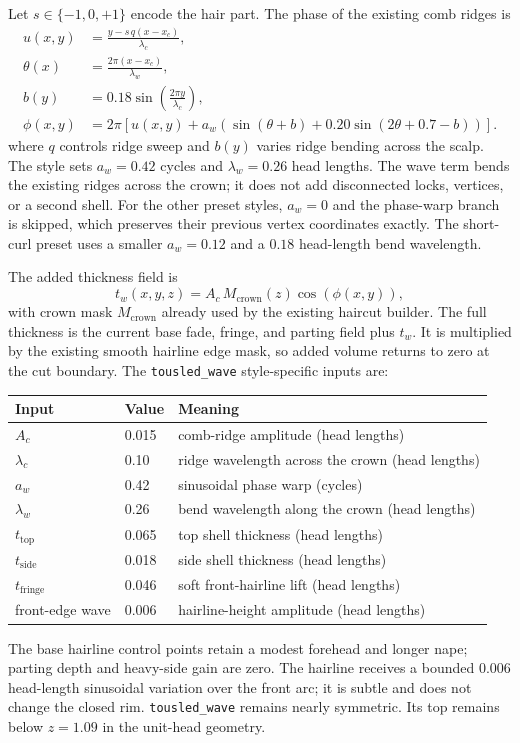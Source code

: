 \documentclass[11pt]{article}
\begin{document}
Let $s\in\{-1,0,+1\}$ encode the hair part. The phase of the existing comb
ridges is
\begin{align}
 u(x,y) &= \frac{y-s\,q(x-x_c)}{\lambda_c},\\
 \theta(x) &= \frac{2\pi(x-x_c)}{\lambda_w},\\
 b(y) &= 0.18\sin\left(\frac{2\pi y}{\lambda_c}\right),\\
 \phi(x,y) &= 2\pi\left[u(x,y)+a_w\left(\sin(\theta+b)+0.20\sin(2\theta+0.7-b)\right)\right].
\end{align}
where $q$ controls ridge sweep and $b(y)$ varies ridge bending across the scalp. The style sets $a_w=0.42$ cycles and
$\lambda_w=0.26$ head lengths. The wave term bends the existing ridges across
the crown; it does not add disconnected locks, vertices, or a second shell.
For the other preset styles, $a_w=0$ and the phase-warp branch is skipped,
which preserves their previous vertex coordinates exactly. The short-curl
preset uses a smaller $a_w=0.12$ and a $0.18$ head-length bend wavelength.

The added thickness field is
\begin{equation}
 t_w(x,y,z)=A_c\,M_{\mathrm{crown}}(z)\cos(\phi(x,y)),
\end{equation}
with crown mask $M_{\mathrm{crown}}$ already used by the existing haircut
builder. The full thickness is the current base fade, fringe, and parting
field plus $t_w$. It is multiplied by the existing smooth hairline edge mask,
so added volume returns to zero at the cut boundary. The \texttt{tousled\_wave}
style-specific inputs are:
\begin{center}
\begin{tabular}{lll}
\toprule
Input & Value & Meaning \\
\midrule
$A_c$ & 0.015 & comb-ridge amplitude (head lengths) \\
$\lambda_c$ & 0.10 & ridge wavelength across the crown (head lengths) \\
$a_w$ & 0.42 & sinusoidal phase warp (cycles) \\
$\lambda_w$ & 0.26 & bend wavelength along the crown (head lengths) \\
$t_{\mathrm{top}}$ & 0.065 & top shell thickness (head lengths) \\
$t_{\mathrm{side}}$ & 0.018 & side shell thickness (head lengths) \\
$t_{\mathrm{fringe}}$ & 0.046 & soft front-hairline lift (head lengths) \\
front-edge wave & 0.006 & hairline-height amplitude (head lengths) \\
\bottomrule
\end{tabular}
\end{center}
The base hairline control points retain a modest forehead and longer nape;
parting depth and heavy-side gain are zero. The hairline receives a bounded
0.006 head-length sinusoidal variation over the front arc; it is subtle and
does not change the closed rim. \texttt{tousled\_wave} remains nearly symmetric. Its top remains below $z=1.09$ in the unit-head geometry.
\end{document}
